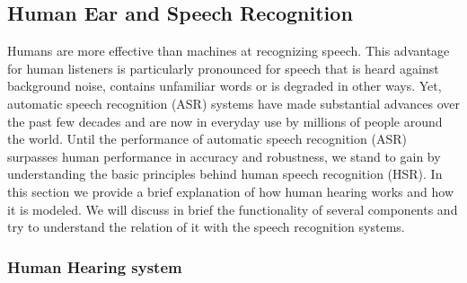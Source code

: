 \subsection{Human Ear and Speech Recognition}
Humans are more effective than machines at recognizing speech. This advantage for
human listeners is particularly pronounced for speech that is heard against
background noise, contains unfamiliar words or is degraded in other ways. Yet,
automatic speech recognition (ASR) systems have made substantial advances over the
past few decades and are now in everyday use by millions of people around the world.
Until the performance of automatic speech recognition (ASR)  surpasses human
performance in accuracy and robustness, we stand to gain by understanding the basic 
principles behind human speech recognition (HSR).
In this section we provide a brief explanation of how human hearing works and 
how it is modeled. We will discuss in brief the functionality of several
components and try to understand the relation of it with the speech recognition systems.

\subsubsection{Human Hearing system}

